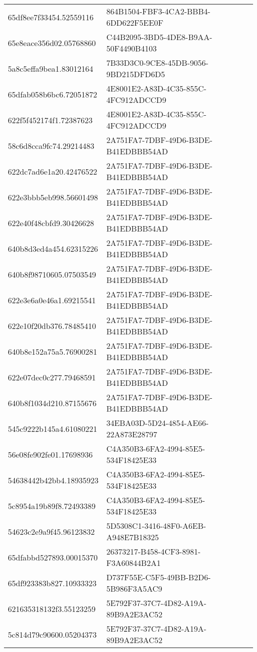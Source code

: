 \begin{tabular}{ll}
65df8ee7f33454.52559116 & 864B1504-FBF3-4CA2-BBB4-6DD622F5EE0F \\
65e8eace356d02.05768860 & C44B2095-3BD5-4DE8-B9AA-50F4490B4103 \\
5a8c5effa9bea1.83012164 & 7B33D3C0-9CE8-45DB-9056-9BD215DFD6D5 \\
65dfab058b6bc6.72051872 & 4E8001E2-A83D-4C35-855C-4FC912ADCCD9 \\
622f5f452174f1.72387623 & 4E8001E2-A83D-4C35-855C-4FC912ADCCD9 \\
58c6d8cca9fc74.29214483 & 2A751FA7-7DBF-49D6-B3DE-B41EDBBB54AD \\
622dc7ad6e1a20.42476522 & 2A751FA7-7DBF-49D6-B3DE-B41EDBBB54AD \\
622e3bbb5eb998.56601498 & 2A751FA7-7DBF-49D6-B3DE-B41EDBBB54AD \\
622e40f48cbfd9.30426628 & 2A751FA7-7DBF-49D6-B3DE-B41EDBBB54AD \\
640b8d3ed4a454.62315226 & 2A751FA7-7DBF-49D6-B3DE-B41EDBBB54AD \\
640b8f98710605.07503549 & 2A751FA7-7DBF-49D6-B3DE-B41EDBBB54AD \\
622e3e6a0e46a1.69215541 & 2A751FA7-7DBF-49D6-B3DE-B41EDBBB54AD \\
622e10f20db376.78485410 & 2A751FA7-7DBF-49D6-B3DE-B41EDBBB54AD \\
640b8e152a75a5.76900281 & 2A751FA7-7DBF-49D6-B3DE-B41EDBBB54AD \\
622e07dec0c277.79468591 & 2A751FA7-7DBF-49D6-B3DE-B41EDBBB54AD \\
640b8f1034d210.87155676 & 2A751FA7-7DBF-49D6-B3DE-B41EDBBB54AD \\
545c9222b145a4.61080221 & 34EBA03D-5D24-4854-AE66-22A873E28797 \\
56e08fe902fe01.17698936 & C4A350B3-6FA2-4994-85E5-534F18425E33 \\
54638442b42bb4.18935923 & C4A350B3-6FA2-4994-85E5-534F18425E33 \\
5c8954a19b89f8.72493389 & C4A350B3-6FA2-4994-85E5-534F18425E33 \\
54623c2e9a9f45.96123832 & 5D5308C1-3416-48F0-A6EB-A948E7B18325 \\
65dfabbd527893.00015370 & 26373217-B458-4CF3-8981-F3A60844B2A1 \\
65df923383b827.10933323 & D737F55E-C5F5-49BB-B2D6-5B986F3A5AC9 \\
621635318132f3.55123259 & 5E792F37-37C7-4D82-A19A-89B9A2E3AC52 \\
5c814d79c90600.05204373 & 5E792F37-37C7-4D82-A19A-89B9A2E3AC52 \\

\end{tabular}
